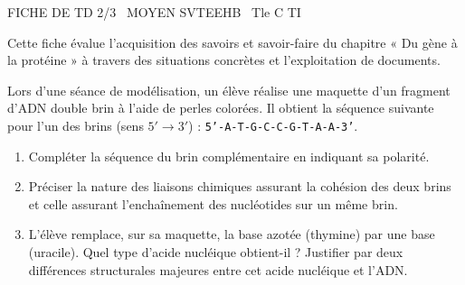 \documentclass[11pt]{article}
\begin{document}
\begin{tcolorbox}[enhanced,colback=popink,colframe=popink,arc=10pt,boxrule=0pt,left=12pt,right=12pt,top=9pt,bottom=9pt]
{\color{white}\popxbold\small FICHE DE TD 2/3 \textbullet\ MOYEN \hfill SVTEEHB \textbullet\ Tle C TI\par}
\end{tcolorbox}
\vspace{4pt}
Cette fiche évalue l'acquisition des savoirs et savoir-faire du chapitre « Du gène à la protéine » à travers des situations concrètes et l'exploitation de documents.

\begin{exercice}
Lors d'une séance de modélisation, un élève réalise une maquette d'un fragment d'ADN double brin à l'aide de perles colorées. Il obtient la séquence suivante pour l'un des brins (sens $5' \to 3'$) : \texttt{5'-A-T-G-C-C-G-T-A-A-3'}.
\begin{enumerate}
    \item Compléter la séquence du brin complémentaire en indiquant sa polarité.
    \item Préciser la nature des liaisons chimiques assurant la cohésion des deux brins et celle assurant l'enchaînement des nucléotides sur un même brin.
    \item L'élève remplace, sur sa maquette, la base azotée  (thymine) par une base  (uracile). Quel type d'acide nucléique obtient-il ? Justifier par deux différences structurales majeures entre cet acide nucléique et l'ADN.
\end{enumerate}
\end{exercice}
\end{document}
